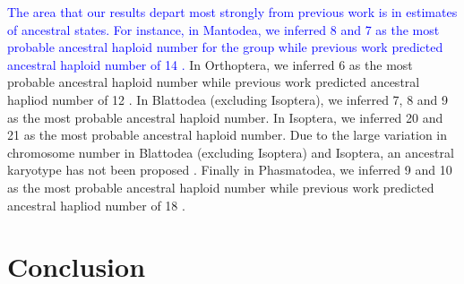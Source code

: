 \documentclass[]{rsos}%
\begin{document}
\textcolor{blue}{The area that our results depart most strongly from previous work is in estimates of ancestral states.
For instance, in Mantodea, we inferred 8 and 7 as the most probable ancestral haploid number for the group while previous work predicted ancestral haploid number of 14 \cite{hughes1950chromosomes}.}
In Orthoptera, we inferred 6 as the most probable ancestral haploid number while previous work predicted ancestral hapliod number of 12 \cite{white1973}.
In Blattodea (excluding Isoptera), we inferred 7, 8 and 9 as the most probable ancestral haploid number. In Isoptera, we inferred 20 and 21 as the most probable ancestral haploid number. Due to the large variation in chromosome number in Blattodea (excluding Isoptera) and Isoptera, an ancestral karyotype has not been proposed \cite{white1976, bergamaschi2007karyology}. 
Finally in Phasmatodea, we inferred 9 and 10 as the most probable ancestral haploid number while previous work predicted ancestral hapliod number of 18 \cite{hughes1959}.

\section{Conclusion}
\end{document}
